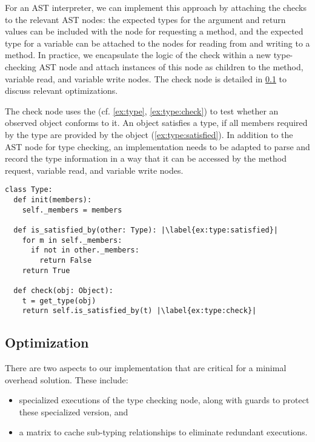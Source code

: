 For an AST interpreter,
we can implement this approach by attaching the checks to the relevant AST nodes:
the expected types for the argument and return values can be included
with the node for requesting a method, and the expected type for a variable
can be attached to the nodes for reading from and writing to a method.
In practice,
we encapsulate the logic of the check within a new type-checking AST node
and attach instances of this node as children to the method,
variable read, and variable write nodes. 
The check node is detailed in \cref{ssec:optimization} to discuss relevant
optimizations.

The check node uses the  (cf. \cref{ex:type}, \cref{ex:type:check}) to test whether an observed
object conforms to it.
An object satisfies a type, if all members required by the type are provided
by the object (\cref{ex:type:satisfied}).
In addition to the AST node for type checking,
an implementation needs to be adapted to parse and record
the type information in a way that it can be accessed by the
method request, variable read, and variable write nodes.


\begin{lstlisting}[label={ex:type},escapechar=|,caption={Sketch of a \code{Type} in our system and its \code{check()} semantics.},float,floatplacement=htb]
class Type:
  def init(members):
    self._members = members

  def is_satisfied_by(other: Type): |\label{ex:type:satisfied}|
    for m in self._members:
      if not in other._members:
        return False
    return True

  def check(obj: Object):
    t = get_type(obj)
    return self.is_satisfied_by(t) |\label{ex:type:check}|
\end{lstlisting}


\subsection{Optimization}
\label{ssec:optimization}

There are two aspects to our implementation that are critical for a minimal overhead solution. These include:

\begin{itemize}
  \item specialized executions of the type checking node, along with guards to protect these specialized version, and
  \item a matrix to cache sub-typing relationships to eliminate redundant executions.
\end{itemize}


